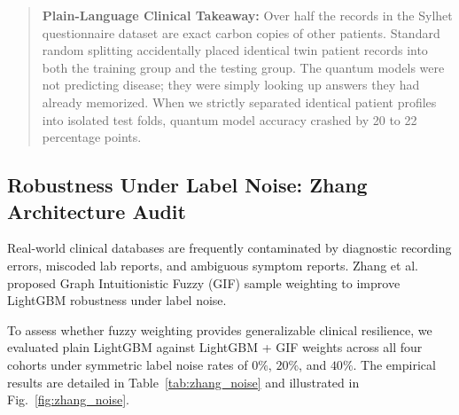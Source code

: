 \documentclass[journal,twocolumn]{IEEEtran}
\begin{document}
\begin{quote}
\small
\textbf{Plain-Language Clinical Takeaway:} Over half the records in the Sylhet questionnaire dataset are exact carbon copies of other patients. Standard random splitting accidentally placed identical twin patient records into both the training group and the testing group. The quantum models were not predicting disease; they were simply looking up answers they had already memorized. When we strictly separated identical patient profiles into isolated test folds, quantum model accuracy crashed by 20 to 22 percentage points.
\end{quote}

\subsection{Robustness Under Label Noise: Zhang Architecture Audit}
\label{sec:zhang_noise}
Real-world clinical databases are frequently contaminated by diagnostic recording errors, miscoded lab reports, and ambiguous symptom reports. Zhang et al.~\cite{zhang2025} proposed Graph Intuitionistic Fuzzy (GIF) sample weighting to improve LightGBM robustness under label noise.

To assess whether fuzzy weighting provides generalizable clinical resilience, we evaluated plain LightGBM against LightGBM + GIF weights across all four cohorts under symmetric label noise rates of $0\%$, $20\%$, and $40\%$. The empirical results are detailed in Table~\ref{tab:zhang_noise} and illustrated in Fig.~\ref{fig:zhang_noise}.
\end{document}
